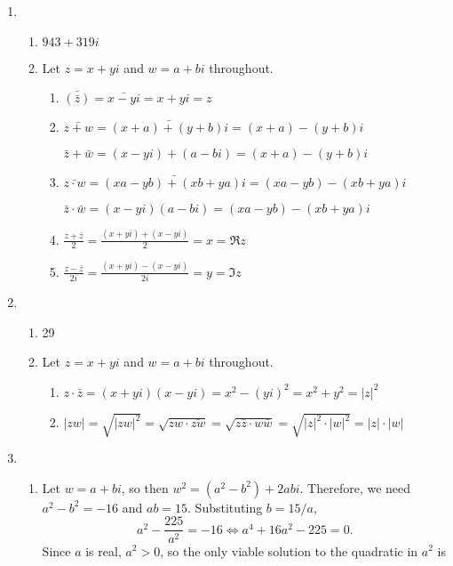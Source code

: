 \begin{enumerate}
\begin{enumerate}
\end{enumerate}
\item \begin{enumerate}
\item $943 + 319i$
\item Let $z = x + yi$ and $w = a + bi$ throughout.
\begin{enumerate}
\item $\bar{(\bar{z})} = \bar{x - yi} = x + yi = z$
\item $\bar{z + w} = \bar{(x + a) + (y + b)i} = (x + a) - (y + b)i$\par
$\bar{z} + \bar{w} = (x - yi) + (a - bi) = (x + a) - (y + b)i$
\item $\bar{z\cdot w} = \bar{(xa - yb) + (xb + ya)i} = (xa - yb) - (xb + ya)i$\par
$\bar{z}\cdot\bar{w} = (x - yi)(a - bi) = (xa - yb) - (xb + ya)i$
\item $\frac{z + \bar{z}}{2} = \frac{(x + yi) + (x - yi)}{2} = x = \Re z$
\item $\frac{z - \bar{z}}{2i} = \frac{(x + yi) - (x - yi)}{2i} = y = \Im z$
\end{enumerate}
\end{enumerate}
\item \begin{enumerate}
\item 29
\item Let $z = x + yi$ and $w = a + bi$ throughout.
\begin{enumerate}
\item $z\cdot\bar{z} = (x + yi)(x - yi) = x^2 - (yi)^2 = x^2 + y^2 = \lvert z\rvert^2$
\item $\lvert zw\rvert = \sqrt{\lvert zw\rvert^2} = \sqrt{zw\cdot\bar{zw}} = \sqrt{z\bar{z}\cdot w\bar{w}} = \sqrt{\lvert z\rvert^2\cdot\lvert w\rvert^2} = \lvert z\rvert\cdot\lvert w\rvert$
\end{enumerate}
\end{enumerate}
\item \begin{enumerate}
\item Let $w = a + bi$, so then $w^2 = (a^2 - b^2) + 2abi$. Therefore, we need $a^2 - b^2 = -16$ and $ab = 15$. Substituting $b = 15/a$,
\begin{equation*}
a^2 - \frac{225}{a^2} = -16\iff a^4 + 16a^2 - 225 = 0.
\end{equation*}
Since $a$ is real, $a^2 > 0$, so the only viable solution to the quadratic in $a^2$ is
\begin{equation*}

\end{equation*}
\end{enumerate}
\end{enumerate}
